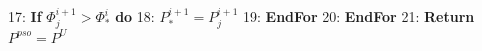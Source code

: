 \documentclass[lettersize,journal]{IEEEtran}
\begin{document}
\begin{algorithm}[tb]
\begin{small}
\begin{algorithmic}[0]
				\STATE \hspace{-0.3cm} {\small 17:} \hspace{-0.05cm}  \hspace{0.75cm} \textbf{If} $\Phi^{i+1}_j>\Phi^{i}_{\ast}$ \textbf{do}
				\STATE \hspace{-0.3cm} {\small 18:} \hspace{-0.05cm}  \hspace{1cm} 	$P^{i+1}_\ast=P^{i+1}_j$
				\STATE \hspace{-0.3cm} {\small 19:} \hspace{-0.05cm}  \hspace{0.1cm}	\textbf{EndFor}
				\STATE \hspace{-0.3cm} {\small 20:} \hspace{-0.15cm}  \hspace{0.0cm}	\textbf{EndFor}
				\STATE \hspace{-0.3cm} {\small 21:} \hspace{-0.15cm}  \hspace{0.0cm} \textbf{Return} $P^{pso}=P^U$
			\end{algorithmic}
		\end{small} 
		\label{alg:alg3} 
	\end{algorithm} 
	
	
\end{document}
